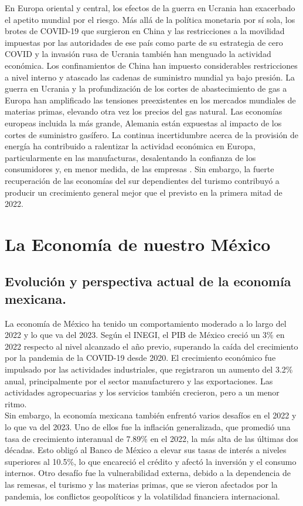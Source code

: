 \documentclass{article}
\theoremstyle{mytheoremstyle}
\theoremstyle{mytheoremstyle}
\theoremstyle{myproblemstyle}
\begin{document}
En Europa oriental y central, los efectos de la guerra en Ucrania han exacerbado el apetito mundial por el riesgo. Más allá de la política monetaria por sí sola, los brotes de COVID-19 que surgieron en China y las restricciones a la movilidad impuestas por las autoridades de ese país como parte de su estrategia de cero COVID y la invasión rusa de Ucrania también han menguado la actividad económica. Los confinamientos de China han impuesto considerables restricciones a nivel interno y atascado las cadenas de suministro mundial ya bajo presión. La guerra en Ucrania y la profundización de los cortes de abastecimiento de gas a Europa han amplificado las tensiones preexistentes en los mercados mundiales de materias primas, elevando otra vez los precios del gas natural. Las economías europeas incluida la más grande, Alemania están expuestas al impacto de los cortes de suministro gasífero. La continua incertidumbre acerca de la provisión de energía ha contribuido a ralentizar la actividad económica en Europa, particularmente en las manufacturas, desalentando la confianza de los consumidores y, en menor medida, de las empresas . Sin embargo, la fuerte recuperación de las economías del sur dependientes del turismo contribuyó a producir un crecimiento general mejor que el previsto en la primera mitad de 2022.\\

\section{La Economía de nuestro México}

\subsection{Evolución y perspectiva actual de la economía mexicana.}

La economía de México ha tenido un comportamiento moderado a lo largo del 2022 y lo que va del 2023. Según el INEGI, el PIB de México creció un 3\% en 2022 respecto al nivel alcanzado el año previo, superando la caída del crecimiento por la pandemia de la COVID-19 desde 2020. El crecimiento económico fue impulsado por las actividades industriales, que registraron un aumento del 3.2\% anual, principalmente por el sector manufacturero y las exportaciones. Las actividades agropecuarias y los servicios también crecieron, pero a un menor ritmo.\\

Sin embargo, la economía mexicana también enfrentó varios desafíos en el 2022 y lo que va del 2023. Uno de ellos fue la inflación generalizada, que promedió una tasa de crecimiento interanual de 7.89\% en el 2022, la más alta de las últimas dos décadas. Esto obligó al Banco de México a elevar sus tasas de interés a niveles superiores al 10.5\%, lo que encareció el crédito y afectó la inversión y el consumo internos. Otro desafío fue la vulnerabilidad externa, debido a la dependencia de las remesas, el turismo y las materias primas, que se vieron afectados por la pandemia, los conflictos geopolíticos y la volatilidad financiera internacional.\\
\end{document}
